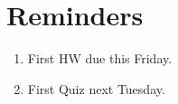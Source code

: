 \documentclass[openany]{book}
\begin{document}
\section{Reminders}
\begin{enumerate}
    \item First HW due this Friday.
    \item First Quiz next Tuesday.
\end{enumerate}
\end{document}
